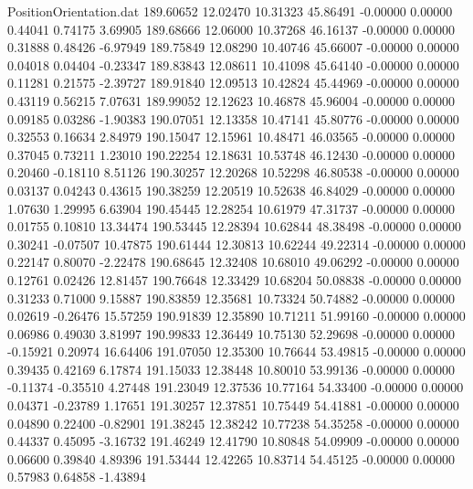 \begin{filecontents}{PositionOrientation.dat}
 189.60652   12.02470   10.31323    45.86491   -0.00000    0.00000    0.44041    0.74175    3.69905
 189.68666   12.06000   10.37268    46.16137   -0.00000    0.00000    0.31888    0.48426   -6.97949
 189.75849   12.08290   10.40746    45.66007   -0.00000    0.00000    0.04018    0.04404   -0.23347
 189.83843   12.08611   10.41098    45.64140   -0.00000    0.00000    0.11281    0.21575   -2.39727
 189.91840   12.09513   10.42824    45.44969   -0.00000    0.00000    0.43119    0.56215    7.07631
 189.99052   12.12623   10.46878    45.96004   -0.00000    0.00000    0.09185    0.03286   -1.90383
 190.07051   12.13358   10.47141    45.80776   -0.00000    0.00000    0.32553    0.16634    2.84979
 190.15047   12.15961   10.48471    46.03565   -0.00000    0.00000    0.37045    0.73211    1.23010
 190.22254   12.18631   10.53748    46.12430   -0.00000    0.00000    0.20460   -0.18110    8.51126
 190.30257   12.20268   10.52298    46.80538   -0.00000    0.00000    0.03137    0.04243    0.43615
 190.38259   12.20519   10.52638    46.84029   -0.00000    0.00000    1.07630    1.29995    6.63904
 190.45445   12.28254   10.61979    47.31737   -0.00000    0.00000    0.01755    0.10810   13.34474
 190.53445   12.28394   10.62844    48.38498   -0.00000    0.00000    0.30241   -0.07507   10.47875
 190.61444   12.30813   10.62244    49.22314   -0.00000    0.00000    0.22147    0.80070   -2.22478
 190.68645   12.32408   10.68010    49.06292   -0.00000    0.00000    0.12761    0.02426   12.81457
 190.76648   12.33429   10.68204    50.08838   -0.00000    0.00000    0.31233    0.71000    9.15887
 190.83859   12.35681   10.73324    50.74882   -0.00000    0.00000    0.02619   -0.26476   15.57259
 190.91839   12.35890   10.71211    51.99160   -0.00000    0.00000    0.06986    0.49030    3.81997
 190.99833   12.36449   10.75130    52.29698   -0.00000    0.00000   -0.15921    0.20974   16.64406
 191.07050   12.35300   10.76644    53.49815   -0.00000    0.00000    0.39435    0.42169    6.17874
 191.15033   12.38448   10.80010    53.99136   -0.00000    0.00000   -0.11374   -0.35510    4.27448
 191.23049   12.37536   10.77164    54.33400   -0.00000    0.00000    0.04371   -0.23789    1.17651
 191.30257   12.37851   10.75449    54.41881   -0.00000    0.00000    0.04890    0.22400   -0.82901
 191.38245   12.38242   10.77238    54.35258   -0.00000    0.00000    0.44337    0.45095   -3.16732
 191.46249   12.41790   10.80848    54.09909   -0.00000    0.00000    0.06600    0.39840    4.89396
 191.53444   12.42265   10.83714    54.45125   -0.00000    0.00000    0.57983    0.64858   -1.43894

\end{filecontents}
